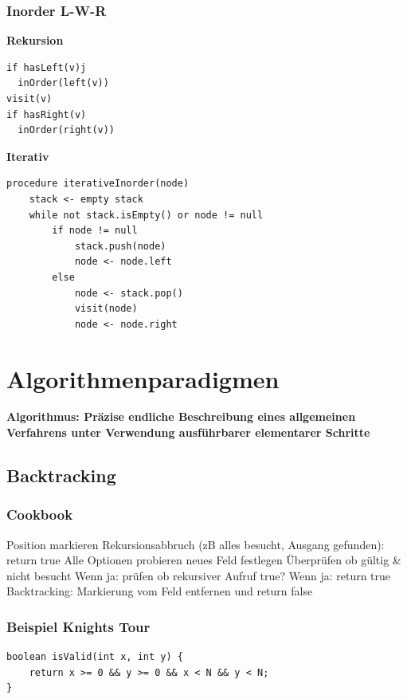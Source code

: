 \begin{multicols*}{4}
		\subsubsection{Inorder L-W-R}
		\textbf{Rekursion}
			\begin{lstlisting}
if hasLeft(v)j
  inOrder(left(v))
visit(v)
if hasRight(v)
  inOrder(right(v))
			\end{lstlisting}
		
		\textbf{Iterativ}
			\begin{lstlisting}
procedure iterativeInorder(node)
	stack <- empty stack
	while not stack.isEmpty() or node != null
		if node != null
			stack.push(node)
			node <- node.left
		else
			node <- stack.pop()
			visit(node)
			node <- node.right
			\end{lstlisting}

\section{Algorithmenparadigmen}
 \textbf{Algorithmus: Präzise endliche Beschreibung eines allgemeinen Verfahrens unter Verwendung
	ausführbarer elementarer Schritte}

	\subsection{Backtracking}
		\subsubsection{Cookbook}
			\renewcommand{\outlineii}{enumerate}
			\renewcommand{\outlineiii}{enumerate}
			\begin{outline}
				\1 Position markieren
				\1 Rekursionsabbruch (zB alles besucht, Ausgang gefunden): return true 
				\1 Alle Optionen probieren
					\2 neues Feld festlegen
					\2 Überprüfen ob gültig \& nicht besucht
						\3 Wenn ja: prüfen ob rekursiver Aufruf true? 
							\4 Wenn ja: return true
				\1 Backtracking: Markierung vom Feld entfernen und return false
			\end{outline}
			\renewcommand{\outlineii}{itemize}
			\renewcommand{\outlineiii}{itemize}
		
		\subsubsection{Beispiel Knights Tour}
			\begin{lstlisting}
boolean isValid(int x, int y) {
	return x >= 0 && y >= 0 && x < N && y < N;
}


\end{lstlisting}
\end{multicols*}
